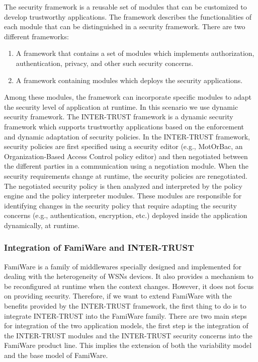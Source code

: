 \documentclass[12pt,a4paper,twoside]{report}
\begin{document}
The security framework is a reusable set of modules that can be customized to develop trustworthy applications. The framework describes the functionalities of each module that can be distinguished in a security framework. There are two different frameworks:\par

\begin{enumerate}
	\item  A framework that contains a set of modules which implements authorization, authentication, privacy, and other such security concerns.
	\item A framework containing modules which deploys the security applications.
\end{enumerate}
Among these modules, the framework can incorporate specific modules to adapt the security level of application at runtime. In this scenario we use dynamic security framework.
The INTER-TRUST framework is a dynamic security framework \cite{ayed;etal:2013} which supports trustworthy applications based on the enforcement and dynamic adaptation of security policies. In the INTER-TRUST framework, security policies are first specified using a security editor (e.g., MotOrBac, an Organization-Based Access Control policy editor) and then negotiated between the different parties in a communication using a negotiation module. When the security requirements change at runtime, the security policies are renegotiated. The negotiated security policy is then analyzed and interpreted by the policy engine and the policy interpreter modules. These modules are responsible for identifying changes in the security policy that require adapting the security concerns (e.g., authentication, encryption, etc.) deployed inside the application dynamically, at runtime.\par

\subsubsection{Integration of FamiWare and INTER-TRUST}
FamiWare is a family of middlewares specially designed and implemented for dealing with the heterogeneity of WSNs devices. It also provides a mechanism to be reconfigured at runtime when the context changes. However, it does not focus on providing security. Therefore, if we want to extend FamiWare with the benefits provided by the INTER-TRUST framework, the first thing to do is to integrate INTER-TRUST into the FamiWare family. There are two main steps for integration of the two application models, the first step is the integration of the INTER-TRUST modules and the INTER-TRUST security concerns into the FamiWare product line. This implies the extension of both the variability model and the base model of FamiWare. \par
\end{document}
